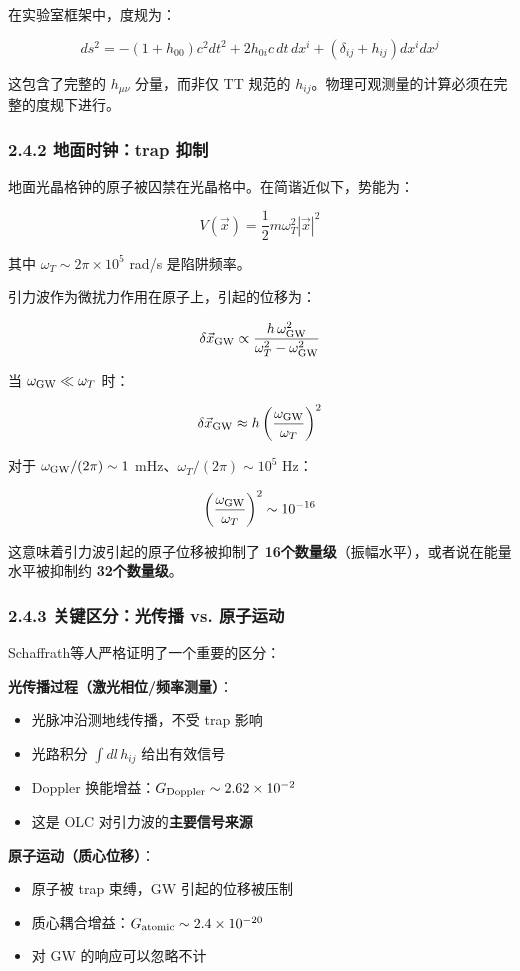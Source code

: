 \documentclass[12pt,a4paper]{article}
\begin{document}
在实验室框架中，度规为：

$$ds^2 = -(1+h_{00})c^2 dt^2 + 2h_{0i}c\, dt\, dx^i + (\delta_{ij} + h_{ij})dx^i dx^j$$

这包含了完整的 $h_{\mu\nu}$ 分量，而非仅 TT 规范的 $h_{ij}$。物理可观测量的计算必须在完整的度规下进行。

\subsubsection{2.4.2 地面时钟：trap 抑制}


地面光晶格钟的原子被囚禁在光晶格中。在简谐近似下，势能为：

$$V(\vec{x}) = \frac{1}{2} m \omega_T^2 |\vec{x}|^2$$

其中 $\omega_T \sim 2\pi \times 10^5$ rad/s 是陷阱频率。

引力波作为微扰力作用在原子上，引起的位移为：

$$\delta \vec{x}_{\rm GW} \propto \frac{h\, \omega_{\rm GW}^2}{\omega_T^2 - \omega_{\rm GW}^2}$$

当 $\omega_{\rm GW} \ll \omega_T$ 时：

$$\delta \vec{x}_{\rm GW} \approx h \left(\frac{\omega_{\rm GW}}{\omega_T}\right)^2$$

对于 $\omega_{\rm GW}/(2\pi) \sim 1$ mHz、$\omega_T/(2\pi) \sim 10^5$ Hz：

$$\left(\frac{\omega_{\rm GW}}{\omega_T}\right)^2 \sim 10^{-16}$$

这意味着引力波引起的原子位移被抑制了 \textbf{16个数量级}（振幅水平），或者说在能量水平被抑制约 \textbf{32个数量级}。

\subsubsection{2.4.3 关键区分：光传播 vs. 原子运动}


Schaffrath等人严格证明了一个重要的区分：

\textbf{光传播过程（激光相位/频率测量）}：
\begin{itemize}
  \item 光脉冲沿测地线传播，不受 trap 影响
  \item 光路积分 $\int dl\, h_{ij}$ 给出有效信号
  \item Doppler 换能增益：$G_{\rm Doppler} \sim 2.62 \times 10^{-2}$
  \item 这是 OLC 对引力波的\textbf{主要信号来源}
\end{itemize}

\textbf{原子运动（质心位移）}：
\begin{itemize}
  \item 原子被 trap 束缚，GW 引起的位移被压制
  \item 质心耦合增益：$G_{\rm atomic} \sim 2.4 \times 10^{-20}$
  \item 对 GW 的响应可以忽略不计
\end{itemize}
\end{document}
